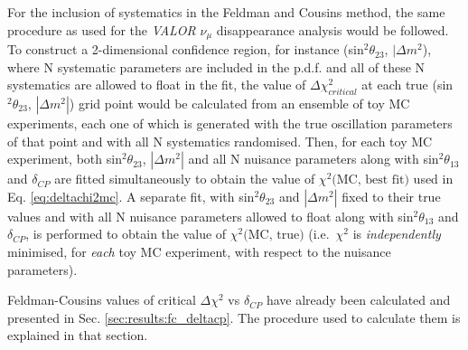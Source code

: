 For the inclusion of systematics in the Feldman and Cousins method, the same procedure as used for the 
{\em VALOR} $\nu_{\mu}$ disappearance analysis would be followed. 
To construct a 2-dimensional confidence region, for instance (sin$^{2}\theta_{23}$, $|\Delta m^{2}$),
where N systematic parameters are included in the p.d.f. and all of these N systematics are allowed to float in the fit,
the value of $\Delta\chi^{2}_{critical}$ at each true (sin$^{2}\theta_{23}$, $|\Delta m^{2}|$) grid point 
would be calculated from an ensemble of toy MC experiments,
each one of which is generated with the true oscillation parameters of that point and with all N systematics randomised.
Then, for each toy MC experiment, both sin$^{2}\theta_{23}$, $|\Delta m^{2}|$ and all N nuisance parameters along with 
sin$^{2}\theta_{13}$ and $\delta_{CP}$ are fitted
simultaneously to obtain the value of $\chi^{2} \textrm{(MC, best fit)}$ used in Eq. \ref{eq:deltachi2mc}.
A separate fit, with sin$^{2}\theta_{23}$ and $|\Delta m^{2}|$ fixed to their true values
and with all N nuisance parameters allowed to float along with sin$^{2}\theta_{13}$ and $\delta_{CP}$, 
is performed to obtain the value of  $\chi^{2} \textrm{(MC, true)}$ (i.e.\ $\chi^{2}$ is \emph{independently} minimised, for \emph{each} toy MC experiment, with respect to the nuisance parameters).

Feldman-Cousins values of critical $\Delta\chi^2$ vs $\delta_{CP}$ have already been calculated and presented in Sec. \ref{sec:results:fc_deltacp}. The procedure used to calculate them is explained in that section. 
